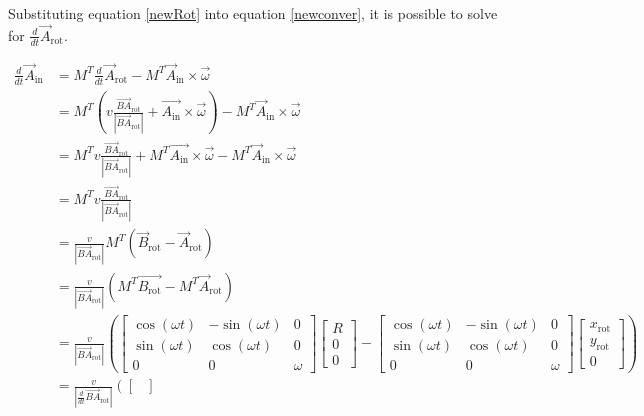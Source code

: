 \documentclass[pstricks, border=12pt]{article}
\begin{document}
Substituting equation \eqref{newRot} into equation \eqref{newconver}, it is possible to solve for $\frac{d}{dt}\Vec{A}_{\text{rot}}$.

\begin{equation}
    \begin{split}
        \frac{d}{dt}\Vec{A}_{\text{in}}&= M^{T}\frac{d}{dt}\Vec{A}_{\text{rot}} - M^{T} \Vec{A}_{\text{in}}\times\vec\omega\\
        &= M^{T}\left(v\frac{\Vec{BA}_{\text{rot}}}{\left|\Vec{BA}_{\text{rot}}\right|} +  \Vec{A_{\text{in}}}\times\vec\omega\right) - M^{T}\Vec{A}_{\text{in}}\times\vec\omega\\
        &=M^{T}v\frac{\Vec{BA}_{\text{rot}}}{\left|\Vec{BA}_{\text{rot}}\right|} + M^{T}\Vec{A_{\text{in}}}\times\vec\omega - M^{T}\Vec{A}_{\text{in}}\times\vec\omega\\
        &=M^{T}v\frac{\Vec{BA}_{\text{rot}}}{\left|\Vec{BA}_{\text{rot}}\right|}\\
        &=\frac{v}{\left|\Vec{BA}_{\text{rot}}\right|}M^T\left(\Vec{B}_{\text{rot}}-\Vec{A}_{\text{rot}}\right)\\
        &=\frac{v}{\left|\Vec{BA}_{\text{rot}}\right|}\left(M^T\Vec{B_{\text{rot}}}-M^T\Vec{A}_{\text{rot}}\right)\\
        &=\frac{v}{\left|\Vec{BA}_{\text{rot}}\right|}\left(\begin{bmatrix}
            \cos(\omega t)&-\sin(\omega t)&0\\
            \sin(\omega t)&\cos(\omega t)&0\\
            0&0&\omega 
        \end{bmatrix}\begin{bmatrix}
            R\\0\\0
        \end{bmatrix} - \begin{bmatrix}
            \cos(\omega t)&-\sin(\omega t)&0\\
            \sin(\omega t)&\cos(\omega t)&0\\
            0&0&\omega 
        \end{bmatrix}\begin{bmatrix}
            x_{\text{rot}}\\y_{\text{rot}}\\0
        \end{bmatrix}\right)\\
        &= \frac{v}{\left|\frac{d}{dt}\Vec{BA}_{\text{rot}}\right|}\left(\begin{bmatrix}

\end{bmatrix}
\end{split}
\end{equation}
\end{document}
